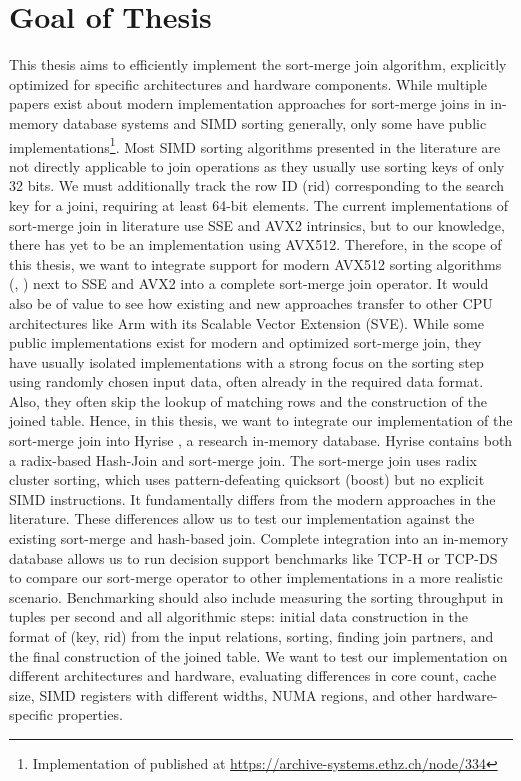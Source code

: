 \section{Goal of Thesis}
\label{sec:goal}


This thesis aims to efficiently implement the sort-merge join algorithm,
explicitly optimized for specific architectures and hardware components. While multiple papers
exist about modern implementation approaches for sort-merge joins in in-memory database systems
and SIMD sorting generally, only some have public 
implementations\footnote{Implementation of \cite{Balkesen} published at \url{https://archive-systems.ethz.ch/node/334}}.
Most SIMD sorting algorithms
presented in the literature are not directly applicable to join operations as they usually use
sorting keys of only 32 bits. We must additionally track the row ID (rid) corresponding to the search key for
a joini, requiring at least 64-bit elements. The current implementations of sort-merge join in literature use SSE and AVX2 intrinsics,
but to our knowledge, there has yet to be an implementation using AVX512. Therefore, in the scope
of this thesis, we want to integrate support for modern AVX512 sorting algorithms (\cite{Watkins}, \cite{8855628})
next to SSE and AVX2 into a complete sort-merge join operator.
It would also be of value to see how existing and new approaches transfer to other
CPU architectures like Arm with its Scalable Vector Extension (SVE). While some public implementations
exist for modern and optimized sort-merge join, they have usually isolated implementations with a strong
focus on the sorting step using randomly chosen input data, often already in the required data format. 
Also, they often skip the lookup of matching rows and the construction of the joined table.
Hence, in this thesis, we want to integrate our implementation of the sort-merge join into Hyrise
\cite{DBLP:conf/edbt/DreselerK0KUP19},
a research in-memory database. Hyrise contains both a radix-based Hash-Join and sort-merge join.
The sort-merge join uses radix cluster sorting, which uses pattern-defeating quicksort (boost)
but no explicit SIMD instructions. It fundamentally differs from the modern approaches in the literature.
These differences allow us to test our implementation against the existing sort-merge and hash-based join.
Complete integration into an in-memory database allows us to run decision support benchmarks
like TCP-H or TCP-DS to compare our sort-merge operator to other implementations in a more realistic scenario.
Benchmarking should also include measuring the sorting throughput in tuples per second and all 
algorithmic steps: initial data construction in the format of (key, rid) from the input relations,
sorting, finding join partners, and the final construction of the joined table. 
We want to test our implementation on different architectures and hardware, evaluating
differences in core count, cache size, SIMD registers with different widths, NUMA regions, 
and other hardware-specific properties.
